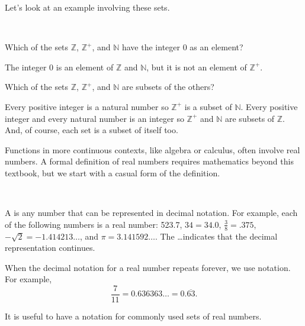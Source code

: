 Let's look at an example involving these sets.

\begin{exam}
\label{exam_sets_integers}
~
    \begin{apart}
        \item Which of the sets $\mathbb{Z}$, $\mathbb{Z}^+$, and $\mathbb{N}$ have the integer 0 as an element?
            \begin{soln}
                The integer 0 is an element of $\mathbb{Z}$ and $\mathbb{N}$, but it is not an element of $\mathbb{Z}^+$.
            \end{soln}

        \item Which of the sets $\mathbb{Z}$, $\mathbb{Z}^+$, and $\mathbb{N}$ are subsets of the others?
            \begin{soln}
                Every positive integer is a natural number so $\mathbb{Z}^+$ is a subset of $\mathbb{N}$.  Every positive integer and every natural number is an integer so $\mathbb{Z^+}$ and $\mathbb{N}$ are subsets of $\mathbb{Z}$.  And, of course, each set is a subset of itself too.
            \end{soln}
        
    \end{apart}
\end{exam}

Functions in more continuous contexts, like algebra or calculus, often involve real numbers.  A formal definition of real numbers requires mathematics beyond this textbook, but we start with a casual form of the definition.

\begin{defn} 
\label{defn_reals}
~
    \begin{apart}
        \item A  is any number that can be represented in decimal notation. For example, each of the following numbers is a real number:  523.7, $34 = 34.0$, $\frac{3}{8} = .375$, $-\sqrt{2} = -1.414213\ldots$, and $\pi = 3.141592\ldots$. The \ldots indicates that the decimal representation continues.
        \item When the decimal notation for a real number repeats forever, we use  notation. For example, $$\frac{7}{11} = 0.636363\ldots = 0.\overline{63}.$$
    \end{apart}
\end{defn}

It is useful to have a notation for commonly used sets of real numbers.

